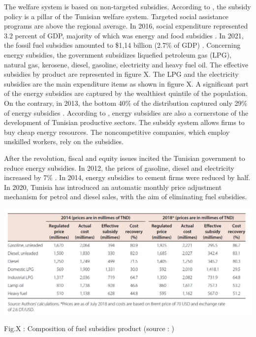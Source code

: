 \documentclass[
]{article}
\begin{document}
The welfare system is based on non-targeted subsidies. According to
\textcite{albertin2014}, the subsidy policy is a pillar of the Tunisian
welfare system. Targeted social assistance programs are above the
regional average. In 2016, social expenditure represented 3.2 percent of
GDP, majority of which was energy and food subsidies
\autocite{tunisia2020}. In 2021, the fossil fuel subsidies amounted to
\$1,14 billion (2.7\% of GDP) \autocite{trésor2021}. Concerning energy
subsidies, the government subsidizes liquefied petroleum gas (LPG),
natural gas, kerosene, diesel, gasoline, electricity and heavy fuel oil.
The effective subsidies by product are represented in figure X. The LPG
and the electricity subsidies are the main expenditure items as shown in
figure X. A significant part of the energy subsidies are captured by the
wealthiest quintile of the population. On the contrary, in 2013, the
bottom 40\% of the distribution captured only 29\% of energy subsidies
\autocite{worldbank2014}. According to \textcite{cuesta2017} , energy
subsidies are also a cornerstone of the development of Tunisian
productive sectors. The subsidy system allows firms to buy cheap energy
resources. The noncompetitive companies, which employ unskilled workers,
rely on the subsidies.

After the revolution, fiscal and equity issues incited the Tunisian
government to reduce energy subsidies. In 2012, the prices of gasoline,
diesel and electricity increased by 7\% \autocite{albertin2014}. In
2014, energy subsidies to cement firms were reduced by half. In 2020,
Tunisia has introduced an automatic monthly price adjustment mechanism
for petrol and diesel sales, with the aim of eliminating fuel subsidies.

\includegraphics{Images/Composition of fuel subsidies by product.jpg}

Fig.X : Composition of fuel subsidies product (source :
\textcite{tunisia2020})
\end{document}
